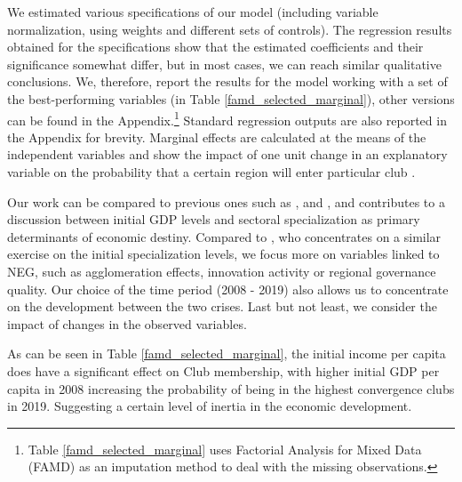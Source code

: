 \documentclass[11pt]{article}
\begin{document}
We estimated various specifications of our model (including variable normalization, using weights and different sets of controls). The regression results obtained for the specifications show that the estimated coefficients and their significance somewhat differ, but in most cases, we can reach similar qualitative conclusions. We, therefore, report the results for the model working with a set of the best-performing variables (in Table \ref{famd_selected_marginal}), other versions can be found in the Appendix.\footnote{Table \ref{famd_selected_marginal} uses Factorial Analysis for Mixed Data (FAMD) as an imputation method to deal with the missing observations.} Standard regression outputs are also reported in the Appendix for brevity. Marginal effects are calculated at the means of the independent variables and show the impact of one unit change in an explanatory variable on the probability that a certain region will enter particular club \citep{carrolloglmx}.

Our work can be compared to previous ones such as \citet{cutrini2019economic}, \citet{von2017regional} and \citet{bartkowska2012regional}, and contributes to a discussion between initial GDP levels and sectoral specialization as primary determinants of economic destiny. Compared to \citet{cutrini2019economic}, who concentrates on a similar exercise on the initial specialization levels, we focus more on variables linked to NEG, such as agglomeration effects, innovation activity or regional governance quality. Our choice of the time period (2008 - 2019) also allows us to concentrate on the development between the two crises. Last but not least, we consider the impact of changes in the observed variables. 

As can be seen in Table \ref{famd_selected_marginal}, the initial income per capita does have a significant effect on Club membership, with higher initial GDP per capita in 2008 increasing the probability of being in the highest convergence clubs in 2019. Suggesting a certain level of inertia in the economic development.
 
\end{document}
